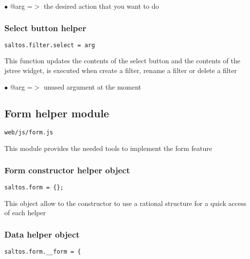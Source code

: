 \documentclass[a4paper]{article}
\begin{document}
\begin{compactitem}
\item[\color{myblue}$\bullet$] @arg =$>$ the desired action that you want to do
\end{compactitem}

\hypertarget{toc772}{}
\subsubsection{Select button helper}

\begin{lstlisting}
saltos.filter.select = arg
\end{lstlisting}

This function updates the contents of the select button and the contents of
the jstree widget, is executed when create a filter, rename a filter or delete
a filter

\begin{compactitem}
\item[\color{myblue}$\bullet$] @arg =$>$ unused argument at the moment
\end{compactitem}

\hypertarget{toc773}{}
\subsection{Form helper module}

\begin{lstlisting}
web/js/form.js
\end{lstlisting}

This module provides the needed tools to implement the form feature

\hypertarget{toc774}{}
\subsubsection{Form constructor helper object}

\begin{lstlisting}
saltos.form = {};
\end{lstlisting}

This object allow to the constructor to use a rational structure for a quick access of each
helper

\hypertarget{toc775}{}
\subsubsection{Data helper object}

\begin{lstlisting}
saltos.form.__form = {
\end{lstlisting}
\end{document}
